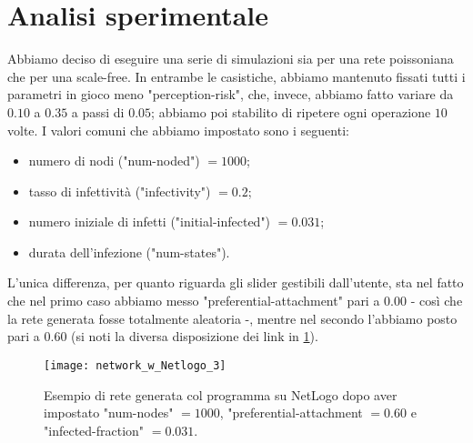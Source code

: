 \section{Analisi sperimentale}
Abbiamo deciso di eseguire una serie di simulazioni sia per una rete poissoniana che per una scale-free. In entrambe le casistiche, abbiamo mantenuto fissati tutti i parametri in gioco meno "perception-risk", che, invece, abbiamo fatto variare da $ 0.10 $ a $ 0.35 $ a passi di $ 0.05 $; abbiamo poi stabilito di ripetere ogni operazione $ 10 $ volte. I valori comuni che abbiamo impostato sono i seguenti:
\begin{itemize}
\item numero di nodi ("num-noded") $ = 1000 $;
\item tasso di infettività ("infectivity") $ = 0.2 $;
\item numero iniziale di infetti ("initial-infected") $ = 0.031 $;
\item durata dell'infezione ("num-states").
\end{itemize}
%
L'unica differenza, per quanto riguarda gli slider gestibili dall'utente, sta nel fatto che nel primo caso abbiamo messo "preferential-attachment" pari a $ 0.00 $  - così che la rete generata fosse totalmente aleatoria -, mentre nel secondo l'abbiamo posto pari a $ 0.60 $ (si noti la diversa disposizione dei link in \cref{fig:NetLogo2}).
\begin{figure}[t]
		\begin{center}
			\texttt{[image: network\_w\_Netlogo\_3]}
			\caption{Esempio di rete generata col programma su NetLogo dopo aver impostato "num-nodes" $= 1000 $, "preferential-attachment $= 0.60 $ e "infected-fraction" $= 0.031 $.}
			\label{fig:NetLogo2}
		\end{center}
\end{figure}
